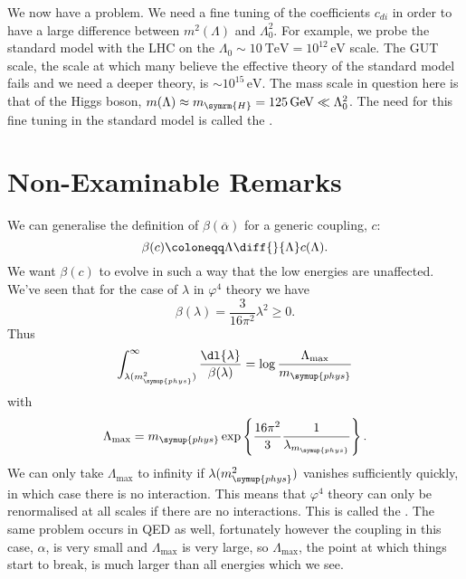 \documentclass[fleqn]{NotesClass}
\newcommand{\phys}{\symup{phys}}
\begin{document}
    We now have a problem.
    We need a fine tuning of the coefficients \(c_{di}\) in order to have a large difference between \(m^2(\Lambda)\) and \(\Lambda_0^2\).
    For example, we probe the standard model with the LHC on the \(\Lambda_0 \sim \qty{10}{\tera\electronvolt} = 10^{12} \, \unit{\electronvolt}\) scale.
    The GUT scale, the scale at which many believe the effective theory of the standard model fails and we need a deeper theory, is \(\sim 10^{15} \, \unit{\electronvolt}\).
    The mass scale in question here is that of the Higgs boson, \(m(\Lambda) \approx m_{\symrm{H}} = \qty{125}{\giga\electronvolt} \ll \Lambda_0^2\).
    The need for this fine tuning in the standard model is called the .
    
    \section{Non-Examinable Remarks}
    We can generalise the definition of \(\beta(\overbar{\alpha})\) for a generic coupling, \(c\):
    \begin{equation}
        \beta(c) \coloneqq \Lambda \diff{}{\Lambda} c(\Lambda).
    \end{equation}
    We want \(\beta(c)\) to evolve in such a way that the low energies are unaffected.
    We've seen that for the case of \(\lambda\) in \(\varphi^4\) theory we have
    \begin{equation}
        \beta(\lambda) = \frac{3}{16\pi^2}\lambda^2 \ge 0.
    \end{equation}
    Thus
    \begin{equation}
        \int_{\lambda(m_{\phys}^2)}^{\infty} \frac{\dl{\lambda}}{\beta(\lambda)} = \log \frac{\Lambda_{\max}}{m_{\phys}}
    \end{equation}
    with
    \begin{equation}
        \Lambda_{\max} = m_{\phys} \exp\left\{ \frac{16\pi^2}{3} \frac{1}{\lambda_{m_{\phys}}} \right\}.
    \end{equation}
    We can only take \(\Lambda_{\max}\) to infinity if \(\lambda(m_{\phys}^2)\) vanishes sufficiently quickly, in which case there is no interaction.
    This means that \(\varphi^4\) theory can only be renormalised at all scales if there are no interactions.
    This is called the .
    The same problem occurs in QED as well, fortunately however the coupling in this case, \(\alpha\), is very small and \(\Lambda_{\max}\) is very large, so \(\Lambda_{\max}\), the point at which things start to break, is much larger than all energies which we see.
    
    
    
    
    
    \appendixpage
    \begin{appendices}
        
        
        
    \end{appendices}
    
    \backmatter
    \renewcommand{\glossaryname}{Acronyms}
    \printglossary[acronym]
    \printindex
\end{document}

